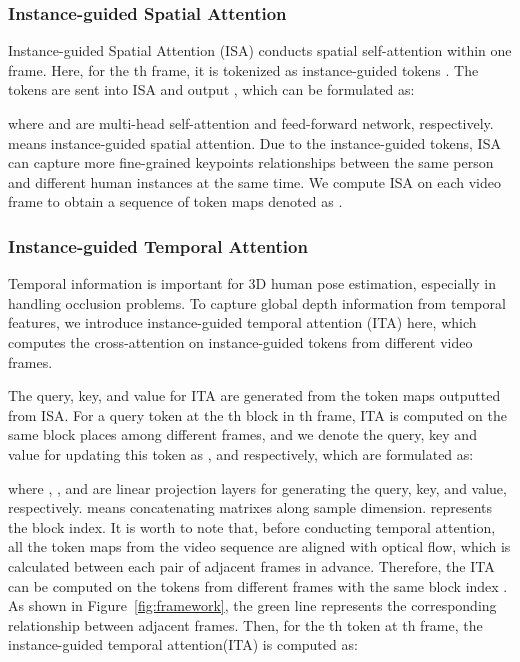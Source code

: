 \documentclass[sigconf]{acmart}
\begin{document}
\subsubsection{Instance-guided Spatial Attention}

Instance-guided Spatial Attention (ISA) conducts spatial self-attention within one frame. Here, for the th frame, it is tokenized as instance-guided tokens . The tokens are sent into ISA and output , which can be formulated as:

where  and  are multi-head self-attention and feed-forward network, respectively.  means instance-guided spatial attention. Due to the instance-guided tokens, ISA can capture more fine-grained keypoints relationships between the same person and different human instances at the same time.
We compute ISA on each video frame to obtain a sequence of token maps denoted as .

\subsubsection{Instance-guided Temporal Attention}
Temporal information is important for 3D human pose estimation, especially in handling occlusion problems. To capture global depth information from temporal features, we introduce instance-guided temporal attention (ITA) here, which computes the cross-attention on instance-guided tokens from different video frames.

The query, key, and value for ITA are generated from the token maps  outputted from ISA.
For a query token  at the th block in th frame, ITA is computed on the same block places among different frames, and we denote the query, key and value for updating this token as ,  and  respectively, which are formulated as:

where , , and  are linear projection layers for generating the query, key, and value, respectively.  means concatenating matrixes along sample dimension.  represents the block index. It is worth to note that, before conducting temporal attention, all the token maps from the video sequence are aligned with optical flow, which is calculated between each pair of adjacent frames in advance. Therefore, the ITA can be computed on the tokens from different frames with the same block index . As shown in Figure~\ref{fig:framework}, the green line represents the corresponding relationship between adjacent frames. Then, for the th token at th frame, the instance-guided temporal attention(ITA) is computed as:
\end{document}
